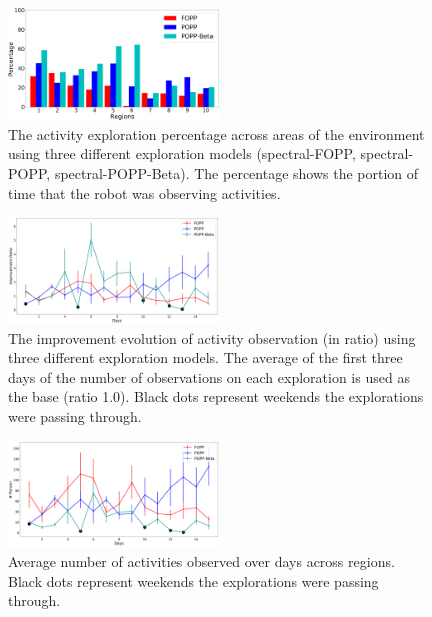 \begin{figure}[t!]
	\centering
	\includegraphics[width=0.5\textwidth]{./figures/exploration_percentage_region.png}
	\caption{The activity exploration percentage across areas of the environment using three different exploration models (spectral-FOPP, spectral-POPP, spectral-POPP-Beta). The percentage shows the portion of time that the robot was observing activities.}
	\label{fig:exploration_percentage_region}
\end{figure}

\begin{figure}[t!]
	\centering
	\includegraphics[width=0.5\textwidth]{./figures/exploration_improvement_ratio.png}
	\caption{The improvement evolution of activity observation (in ratio) using three different exploration models. The average of the first three days of the number of observations on each exploration is used as the base (ratio 1.0). Black dots represent weekends the explorations were passing through.}
	\label{fig:exploration_improvement_ratio}
\end{figure}

\begin{figure}[t!]
	\centering
	\includegraphics[width=0.5\textwidth]{./figures/exploration_number_people_across_days.png}
	\caption{Average number of activities observed over days across regions. Black dots represent weekends the explorations were passing through.}
	\label{fig:exploration_number_people_across_days}
\end{figure}

